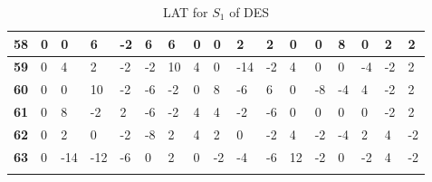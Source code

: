 \begin{longtable}[c]{|l|l|l|l|l|l|l|l|l|l|l|l|l|l|l|l|l|}
\textbf{58} & 0          & 0          & 6          & -2         & 6          & 6          & 0          & 0          & 2          & 2          & 0           & 0           & 8           & 0           & 2           & 2            \\ \hline
\textbf{59} & 0          & 4          & 2          & -2         & -2         & 10         & 4          & 0          & -14        & -2         & 4           & 0           & 0           & -4          & -2          & 2            \\ \hline
\textbf{60} & 0          & 0          & 10         & -2         & -6         & -2         & 0          & 8          & -6         & 6          & 0           & -8          & -4          & 4           & -2          & 2            \\ \hline
\textbf{61} & 0          & 8          & -2         & 2          & -6         & -2         & 4          & 4          & -2         & -6         & 0           & 0           & 0           & 0           & -2          & 2            \\ \hline
\textbf{62} & 0          & 2          & 0          & -2         & -8         & 2          & 4          & 2          & 0          & -2         & 4           & -2          & -4          & 2           & 4           & -2           \\ \hline
\textbf{63} & 0          & -14        & -12        & -6         & 0          & 2          & 0          & -2         & -4         & -6         & 12          & -2          & 0           & -2          & 4           & -2           \\ \hline
\caption{LAT for $S_1$ of DES}
\label{tbl:lat1}
\end{longtable}